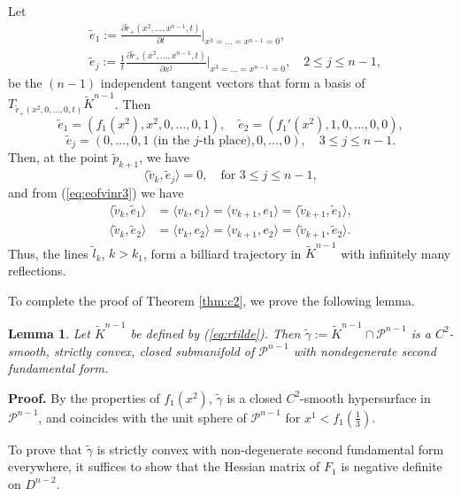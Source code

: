 \documentclass[12pt]{article}
\newtheorem{lemma}{Lemma}
\begin{document}
Let  
$$
\begin{aligned}
  & \tilde{e}_1 := \frac{\partial \tilde{r}_+(x^2, \ldots, x^{n-1}, t)}{\partial t} \bigg|_{x^3 = \ldots = x^{n-1} = 0},\\
  & \tilde{e}_j := \frac{1}{t} \frac{\partial \tilde{r}_+(x^2, \ldots, x^{n-1}, t)}{\partial x^j} \bigg|_{x^3 = \ldots = x^{n-1} = 0}, \quad 2 \leq j \leq n-1,
\end{aligned}
$$  
be the $(n-1)$ independent tangent vectors that form a basis of $T_{\tilde{r}_+(x^2,0,\ldots, 0,t)}\tilde{K}^{n-1}$. Then  
$$
\tilde{e}_1 = (f_1(x^2), x^2, 0, \ldots, 0, 1),
\quad 
\tilde{e}_2 = (f_1'(x^2), 1, 0, \ldots, 0, 0),
$$ 
$$
\tilde{e}_j = (0, \ldots, 0, 1 \text{ (in the $j$-th place)}, 0, \ldots, 0), \quad 3 \leq j \leq n-1.
$$  
Then, at the point $\tilde{p}_{k+1}$, we have  
$$
\langle \tilde{{v}}_{k}, \tilde{e}_j \rangle = 0, \quad \text{for } 3 \leq j \leq n-1, 
$$  
and from (\ref{eq:eofvinr3}) we have  
$$
\begin{aligned}
  \langle \tilde{{v}}_{k}, \tilde{e}_1 \rangle &=  
  \langle {{v}}_{k}, e_1 \rangle = \langle {{v}}_{k+1}, e_1 \rangle
  = \langle \tilde{{v}}_{k+1}, \tilde{e}_1 \rangle, \\
  \langle \tilde{{v}}_{k}, \tilde{e}_2 \rangle &= 
  \langle {{v}}_{k}, e_2 \rangle = \langle {{v}}_{k+1}, e_2 \rangle
  = \langle \tilde{{v}}_{k+1}, \tilde{e}_2 \rangle.
\end{aligned}
$$  
Thus, the lines $\tilde{l}_k$, $k > k_1$, form a billiard trajectory in $\tilde{K}^{n-1}$ with infinitely many reflections.

To complete the proof of Theorem \ref{thm:c2}, we prove the following lemma.
\begin{lemma}\label{lem:hessian}
  Let $\tilde{K}^{n-1}$ be defined by (\ref{eq:rtilde}). 
  Then 
  $\tilde{\gamma}:= \tilde{K}^{n-1}\cap \mathcal{P}^{n-1}$ is a $C^2$-smooth, strictly convex, closed submanifold of $\mathcal{P}^{n-1}$ with nondegenerate second fundamental form. 
\end{lemma}
\textbf{Proof.}
By the properties of $f_1(x^2)$, $\tilde{\gamma}$ is a closed $C^2$-smooth hypersurface in $\mathcal{P}^{n-1}$, and coincides with the unit sphere of $\mathcal{P}^{n-1}$ for $x^1 < f_1(\frac{1}{3})$. 

To prove that $\tilde{\gamma}$ is strictly convex with non-degenerate second fundamental form everywhere, it suffices to show that the Hessian matrix of $F_1$ is negative definite on $D^{n-2}$.
\end{document}
